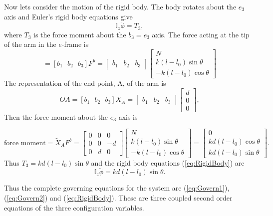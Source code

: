\documentclass[graybox,envcountchap,sectrefs]{svmonoMuga}
\begin{document}
Now lets consider the motion of the rigid body. The body rotates about the $e_3$ axis and  Euler's rigid body equations give
\begin{equation}\label{eq:RigidBody0}
\mathbb{I}_z\ddot{\phi}=T_3,
\end{equation}
where $T_3$ is the force moment about the $b_3=e_3$ axis. The force acting at the tip of the arm in the $e$-frame is
\[
=[b_1\:\:\:b_2\:\:\:b_3]F^b = \left[\begin{array}{ccc} b_1 & b_2 & b_3 \end{array} \right] \left[\begin{array}{c} N \\ k(l-l_0)\sin{\theta} \\ -k(l-l_0)\cos{\theta} \end{array}\right]
\]
The representation of the end point, A,  of the arm is
\[
OA=[b_1\:\:\:b_2\:\:\:b_3]X_A=\left[\begin{array}{ccc} b_1 & b_2 & b_3\end{array} \right] \left[\begin{array}{c} d \\ 0 \\0\end{array}\right],
\]
Then the force moment about the $e_3$ axis is

\[
\mbox{force moment}=\tilde{X}_A F^b= \left[\begin{array}{ccc} 0 & 0 & 0\\0 & 0 & -d\\0 & d & 0 \end{array} \right] \left[\begin{array}{c} N \\ k(l-l_0)\sin{\theta}\\ -k(l-l_0)\cos{\theta} \end{array}\right]=\left[\begin{array}{c}0 \\ kd(l-l_0)\cos{\theta}\\kd(l-l_0)\sin{\theta}\end{array}\right].
\]
Thus $T_3=kd(l-l_0)\sin{\theta}$ and the rigid body equations (\ref{eq:RigidBody}) are
\begin{equation}\label{eq:RigidBody}
\mathbb{I}_z\ddot{\phi}=kd(l-l_0)\sin{\theta}.
\end{equation}


Thus the complete governing equations for the system are (\ref{eq:Govern1}),(\ref{eq:Govern2}) and (\ref{eq:RigidBody}). These are three coupled second order equations of the 
three configuration variables.
\end{document}
